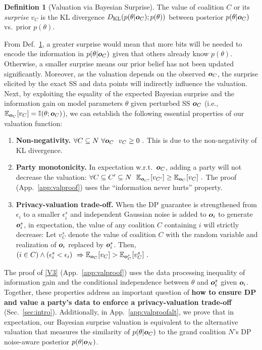 \documentclass{article}
\theoremstyle{plain}
\theoremstyle{definition}
\newtheorem{definition}[theorem]{Definition}
\theoremstyle{remark}
\begin{document}
\begin{definition}[Valuation via Bayesian Surprise]\label{def:bs}
The value of coalition $C$ or its \emph{surprise} $v_C$ is the KL divergence $D_{\mathrm{KL}}\hspace{-0.5mm}\left(p(\theta|{\bm{o}}_C); p(\theta)\right)$ between posterior $p(\theta|{\bm{o}}_C)$ vs.~prior $p(\theta)$.   
\end{definition}
From Def.~\ref{def:bs}, a greater surprise would mean that more bits will be needed to encode the information in $p(\theta|{\bm{o}}_C)$ given that others already know $p(\theta)$. Otherwise, a smaller surprise means our prior belief has not been updated significantly. 
Moreover, as the valuation depends on the observed ${\bm{o}}_C$, the surprise elicited by the exact SS and data points will indirectly 
influence the valuation. 
Next, by exploiting the equality of the expected Bayesian surprise and the information gain on model parameters $\theta$ given perturbed SS ${\bm{o}}_C$ (i.e., $\mathbb{E}_{{\bm{o}}_C}[v_C] = \mathbb{I}\hspace{-0.5mm}\left(\theta; {\bm{o}}_C\right)$), we can establish the following essential properties of our valuation function:
\begin{enumerate}[label=V\arabic*,leftmargin=*,itemsep=4pt,topsep=0pt,parsep=0pt,partopsep=0pt]
    \item \label{V1} \textbf{Non-negativity.} $\forall C\subseteq N \ \forall {\bm{o}}_C\ \ v_C \geq 0\ .$ This is due to the non-negativity of KL divergence.
    \item \label{V2} \textbf{Party monotonicity.} In expectation %
    w.r.t.~${\bm{o}}_C$, adding a party will not decrease the valuation: $\forall C\subseteq C'\subseteq N\ \ \E_{\vo_{C'}} [v_{C'}] \geq \E_{\vo_C} [v_C]\ .$ The proof (App.~\ref{app:valproof}) uses the ``information never hurts'' property.
    \item \label{V3} \textbf{Privacy-valuation trade-off.} 
    When the DP guarantee is strengthened from $\epsilon_i$ to a smaller $\epsilon_i^s$ and independent Gaussian noise is added to ${\bm{o}}_i$ to generate ${\bm{o}}^s_i$, in expectation, the value of any coalition $C$ containing $i$ will strictly decrease: Let $v_C^s$ denote the value of coalition $C$ with the random variable and realization of ${\bm{o}}_i$ replaced by ${\bm{o}}^s_i$. Then,
    ${(i \in C)} \land (\epsilon^s_i < \epsilon_i)\ \Rightarrow \E_{\vo_C} [v_C] > \E_{\vo_C^s} [v_C^s]\ .$  
\end{enumerate}
The proof of \ref{V3} (App.~\ref{app:valproof}) uses the data processing inequality of information gain and the conditional independence between $\theta$ and ${\bm{o}}_i^s$ given ${\bm{o}}_i$. Together, these properties address an important question of {\bf how to ensure DP and value a party's data to enforce a privacy-valuation trade-off} (Sec.~\ref{sec:intro}).
Additionally, in App.~\ref{app:valproofalt}, we prove that in expectation, our Bayesian surprise valuation is equivalent to the alternative valuation that measures the similarity of $p(\theta|{\bm{o}}_C)$ to the grand coalition $N$'s DP noise-aware posterior $p(\theta|{\bm{o}}_N)$.
\end{document}
